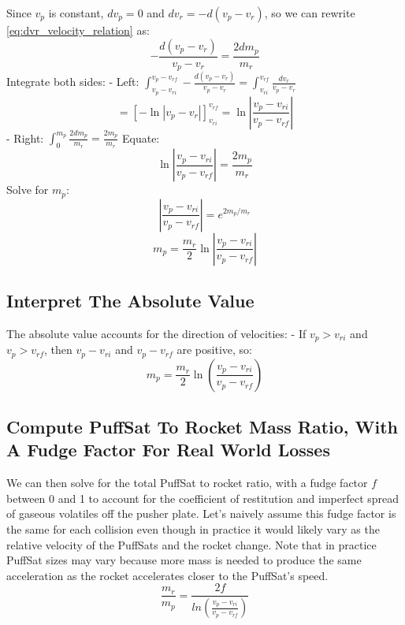 \documentclass{article}
\begin{document}
Since \(v_p\) is constant,  \(dv_p = 0\) and  \(dv_r = -d(v_p-v_r)\), so we can rewrite \autoref{eq:dvr_velocity_relation} as:
\[
-\frac{d(v_p - v_r)}{v_p - v_r} = \frac{2 dm_p}{m_r}
\]
Integrate both sides:
- Left: \( \int_{v_p - v_{ri}}^{v_p - v_{rf}} -\frac{d(v_p - v_r)}{v_p - v_r} = \int_{v_{ri}}^{v_{rf}} \frac{dv_r}{v_p - v_r} \)
\[
= \left[ -\ln|v_p - v_r| \right]_{v_{ri}}^{v_{rf}} = \ln \left| \frac{v_p - v_{ri}}{v_p - v_{rf}} \right|
\]
- Right: \( \int_0^{m_p} \frac{2 dm_p}{m_r} = \frac{2 m_p}{m_r} \)
Equate:
\[
\ln \left| \frac{v_p - v_{ri}}{v_p - v_{rf}} \right| = \frac{2 m_p}{m_r}
\]
Solve for \( m_p \):
\[
\left| \frac{v_p - v_{ri}}{v_p - v_{rf}} \right| = e^{2 m_p / m_r}
\]
\begin{equation}
m_p = \frac{m_r}{2} \ln \left| \frac{v_p - v_{ri}}{v_p - v_{rf}} \right| 
\end{equation}
\subsection{Interpret The Absolute Value}   
The absolute value accounts for the direction of velocities:
- If \( v_p > v_{ri} \) and \( v_p > v_{rf} \),  then \( v_p - v_{ri} \) and \( v_p - v_{rf} \) are positive, so:
\[
m_p = \frac{m_r}{2} \ln \left( \frac{v_p - v_{ri}}{v_p - v_{rf}} \right)
\]
\subsection{Compute PuffSat To Rocket Mass Ratio, With A Fudge Factor For Real World Losses}

We can then solve for the total PuffSat to rocket ratio, with a fudge factor $f$ between 0 and 1 to account for the coefficient of restitution and imperfect spread of gaseous volatiles off the pusher plate.   Let's naively assume this fudge factor is the same for each collision even though in practice it would likely vary as the relative velocity of the PuffSats and the rocket change.  Note that in practice PuffSat sizes may vary because more mass is needed to produce the same acceleration as the rocket accelerates closer to the PuffSat's speed.
\begin{equation}
\frac{m_r}{m_p} = \frac{2f}{ln(\frac{v_p-v_{ri}}{v_p-v_{rf}})}\label{eq:PuffSat_ratio}
\end{equation}
\end{document}
